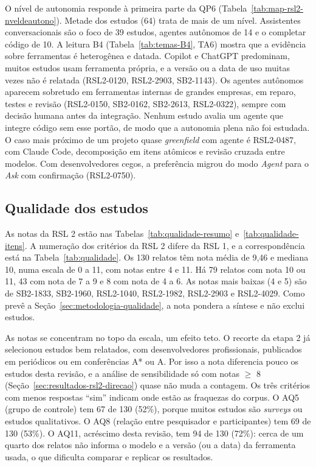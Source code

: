O nível de autonomia responde à primeira parte da QP6
(Tabela~\ref{tab:map-rsl2-nveldeautono}). Metade dos estudos (64) trata de
mais de um nível. Assistentes conversacionais são o foco de 39 estudos,
agentes autônomos de 14 e o completar código de 10. A leitura B4
(Tabela~\ref{tab:temas-B4}, TA6) mostra que a evidência sobre ferramentas é
heterogênea e datada. Copilot e ChatGPT predominam, muitos estudos usam
ferramenta própria, e a versão ou a data de uso muitas vezes não é relatada
(RSL2-0120, RSL2-2903, SB2-1143). Os agentes autônomos aparecem sobretudo em
ferramentas internas de grandes empresas, em reparo, testes e revisão
(RSL2-0150, SB2-0162, SB2-2613, RSL2-0322), sempre com decisão humana antes
da integração. Nenhum estudo avalia um agente que integre código sem esse
portão, de modo que a autonomia plena não foi estudada. O caso
mais próximo de um projeto quase \textit{greenfield} com agente é RSL2-0487,
com Claude Code, decomposição em itens atômicos e revisão cruzada entre
modelos. Com desenvolvedores cegos, a preferência migrou do modo
\textit{Agent} para o \textit{Ask} com confirmação (RSL2-0750).

\subsection{Qualidade dos estudos}
\label{sec:resultados-rsl2-qualidade}

As notas da RSL 2 estão nas Tabelas~\ref{tab:qualidade-resumo}
e~\ref{tab:qualidade-itens}. A numeração dos critérios da RSL 2 difere da RSL
1, e a correspondência está na Tabela~\ref{tab:qualidade}. Os 130 relatos
têm nota média de 9,46 e mediana 10, numa escala de 0 a 11, com notas entre 4
e 11. Há 79 relatos com nota 10 ou 11, 43 com nota de 7 a 9 e 8 com nota de 4
a 6. As notas mais baixas (4 e 5) são de SB2-1833, SB2-1960, RSL2-1040,
RSL2-1982, RSL2-2903 e RSL2-4029. Como prevê a
Seção~\ref{sec:metodologia-qualidade}, a nota pondera a síntese e não exclui
estudos.

As notas se concentram no topo da escala, um efeito teto. O recorte da etapa
2 já selecionou estudos bem relatados, com desenvolvedores profissionais,
publicados em periódicos ou em conferências A* ou A. Por isso a nota diferencia pouco os estudos
desta revisão, e a análise de sensibilidade só com notas $\geq$ 8
(Seção~\ref{sec:resultados-rsl2-direcao}) quase não muda a contagem. Os três
critérios com menos respostas ``sim'' indicam onde estão as fraquezas do
corpus. O AQ5 (grupo de controle) tem 67 de 130 (52\%), porque muitos estudos
são \textit{surveys} ou estudos qualitativos. O AQ8 (relação entre
pesquisador e participantes) tem 69 de 130 (53\%). O AQ11, acréscimo desta
revisão, tem 94 de 130 (72\%): cerca de um quarto dos relatos não informa o
modelo e a versão (ou a data) da ferramenta usada, o que dificulta comparar
e replicar os resultados.

